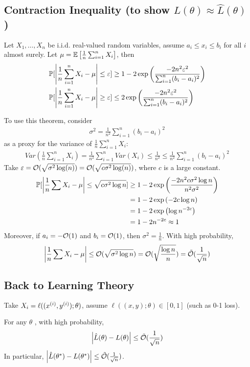 \documentclass[11pt]{article}
\newcommand{\explr}[1]{\exp\left({#1}\right)}
\begin{document}
	\subsection{Contraction Inequality (to show $L(\theta) \approx \hat{L}(\theta)$)}
	\begin{theorem}
		Let $X_1, \dots, X_n$ be i.i.d. real-valued random variables, assume $a_i \leq x_i \leq b_i$ for all $i$ almost surely. Let $\mu = \mathbb{E}\left[{\frac{1}{n} \sum_{i=1}^n X_i}\right]$, then
		\begin{align}
			\prob{\abs{\frac{1}{n} \sum_{i=1}^n X_i - \mu} \leq \varepsilon} &\geq 1 - 2 \explr{\frac{-2n^2 \varepsilon^2}{\sum_{i=1}^n (b_i - a_i)^2}} \\
			\prob{\abs{\frac{1}{n} \sum_{i=1}^n X_i - \mu} \geq \varepsilon} &\leq 2 \explr{\frac{-2n^2 \varepsilon^2}{\sum_{i=1}^n (b_i - a_i)^2}}
		\end{align}
	\end{theorem}
	To use this theorem, consider
	\begin{align}
		\sigma^2 = \frac{1}{n^2} \sum_{i=1}^n (b_i - a_i)^2
	\end{align}
	as a proxy for the variance of $\frac{1}{n} \sum_{i=1}^n X_i$:
	\begin{align}
		Var(\frac{1}{n} \sum_{i=1}^n X_i) = \frac{1}{n^2} \sum_{i=1}^n Var(X_i) \leq \frac{1}{n^2} \leq \frac{1}{n^2} \sum_{i=1}^n (b_i - a_i)^2
	\end{align}
	Take $\varepsilon = \mathcal{{O}}(\sqrt{\sigma^2 \log(n)}) = \mathcal{{O}}(\sqrt{c \sigma^2 \log(n)})$, where $c$ is a large constant.
	\begin{align}
		\prob{\abs{\frac{1}{n} \sum X_i - \mu } \leq \sqrt{c \sigma^2 \log n}} &\geq 1 - 2 \explr{\frac{-2 n^2 c \sigma^2 \log n}{n^2 \sigma^2}} \\
		&= 1 - 2 \explr{-2 c  \log n} \\
		&= 1 - 2 \explr{\log n^{-2 c}} \\
		&= 1 - 2n^{-2c} \approx 1
	\end{align}
	Moreover, if $a_i = - \mathcal{{O}}(1)$ and $b_i = \mathcal{{O}}(1)$, then $\sigma^2 = \frac{1}{n}$.
	With high probability,
	\begin{align}
		\left \vert {\frac{1}{n}\sum X_i - \mu} \right \vert \leq \mathcal{{O}}(\sqrt{\sigma^2 \log n}) = \mathcal{{O}}(\sqrt{\frac{\log n}{n}}) = \tilde{\mathcal{{O}}}(\frac{1}{\sqrt{n}})
	\end{align}
	
	\subsection{Back to Learning Theory}
	\par Take $X_i = \ell((x^{(i)}, y^{(i)}); \theta)$, assume $\ell((x,y);\theta) \in [0, 1]$ (such as 0-1 loss).
	\begin{lemma}
		For any $\theta$ , with high probability,
		\begin{align}
			\left \vert {\hat{L}(\theta) - L(\theta)} \right \vert \leq \tilde{\mathcal{{O}}}(\frac{1}{\sqrt{n}})
		\end{align}
		In particular, $\left \vert {\hat{L}(\theta^*) - L(\theta^*)} \right \vert \leq \tilde{\mathcal{{O}}}(\frac{1}{\sqrt{n}})$.
	\end{lemma}
\end{document}
